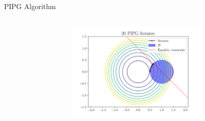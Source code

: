 \documentclass[aspectratio=169]{beamer}
\begin{document}
\begin{frame}{PIPG Algorithm}
\begin{columns}[T]
\begin{column}{.5\textwidth}
        \end{column}
        \begin{column}{.5\textwidth}
            \includegraphics[width=6.75cm]{img/actual_pipg_iterates.png}
        \end{column}
    \end{columns}
\end{frame}

    
\end{document}
